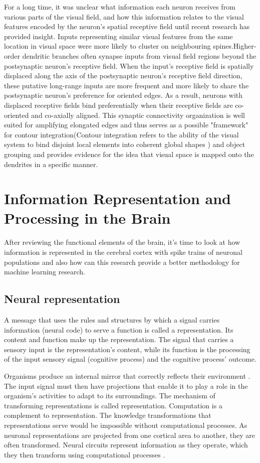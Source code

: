 \documentclass[12pt]{report}
\begin{document}
For a long time, it was unclear what information each neuron receives from various parts of the visual field, and how this information relates to the visual features encoded by the neuron's spatial receptive field until recent research has provided insight. Inputs representing similar visual features from the same location in visual space were more likely to cluster on neighbouring spines.Higher-order dendritic branches often synapse inputs from visual field regions beyond the postsynaptic neuron's receptive field. When the input's receptive field is spatially displaced along the axis of the postsynaptic neuron's receptive field direction, these putative long-range inputs are more frequent and more likely to share the postsynaptic neuron's preference for oriented edges. As a result, neurons with displaced receptive fields bind preferentially when their receptive fields are co-oriented and co-axially aligned. This synaptic connectivity organization is well suited for amplifying elongated edges and thus serves as a possible "framework" for contour integration(Contour integration refers to the ability of the visual system to bind disjoint local elements into coherent global shapes \cite{persike2016}) and object grouping \cite{Iacaruso2017} and provides evidence for the idea that visual space is mapped onto the dendrites in a specific manner.


\section{Information Representation and Processing in the Brain}
After reviewing the functional elements of the brain, it's time to look at how information is represented in the cerebral cortex with spike trains of neuronal populations and also how can this research provide a better methodology for machine learning research.
\subsection{Neural representation}
A message that uses the rules and structures by which a signal carries information (neural code) to serve a function is called a representation. Its content and function make up the representation. The signal that carries a sensory input is the representation's content, while its function is the processing of the input sensory signal (cognitive process) and the cognitive process' outcome.

Organisms produce an internal mirror that correctly reflects their environment \cite{Koch1994}. The input signal must then have projections that enable it to play a role in the organism's activities to adapt to its surroundings. The mechanism of transforming representations is called representation. Computation is a complement to representation. The knowledge transformations that representations serve would be impossible without computational processes. As neuronal representations are projected from one cortical area to another, they are often transformed. Neural circuits represent information as they operate, which they then transform using computational processes \cite{decharms2000}. 
\end{document}
